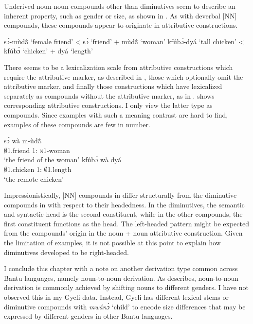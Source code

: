 Underived noun-noun compounds other than diminutives seem to describe an inherent property, such as gender or size, as shown in . As with deverbal [NN] compounds, these compounds appear to originate in attributive constructions.

\ea \label{CompoundNN2}
\ea  sɔ́-mùdã̂ `female friend' < sɔ́ `friend' + mùdã̂ `woman'
\ex kfúbɔ̀-dyá `tall chicken' < kfúbɔ̀ `chicken' + dyá `length'
\z
\z

\noindent There seems to be a lexicalization scale from attributive constructions which require the attributive marker, as described in , those which optionally omit the attributive marker, and finally those constructions which have lexicalized separately as compounds without the attributive marker, as in .  shows corresponding attributive constructions. I only view the latter type as compounds. Since examples with such a meaning contrast are hard to find, examples of these compounds are few in number.

\ea\label {CompoundNN3}
\ea  \gll
sɔ́ wà m-ùdã̂  \\ 
$\emptyset$1.friend 1:{\ATT} \textsc{n}1-woman \\
\trans `the friend of the woman'
\ex
\gll kfúbɔ̀ wà dyá \\
   $\emptyset$1.chicken 1:{\ATT} $\emptyset$1.length \\
\trans `the remote chicken'
\z
\z

Impressionistically, [NN] compounds in  differ structurally from the diminutive compounds in  with respect to their headedness. In the diminutives, the semantic and syntactic head is the second constituent, while in the other compounds, the first constituent functions as the head. The left-headed pattern might be expected from the compounds' origin in the noun + noun attributive construction. Given the limitation of examples, it is not possible at this point to explain how diminutives developed to be right-headed.


I conclude this chapter with a note on another derivation type common across Bantu languages, namely noun-to-noun derivation. As \citet[82]{schadeberg2003} describes, noun-to-noun derivation is commonly achieved by shifting nouns to different genders. I have not  observed this in my Gyeli data. Instead, Gyeli has different lexical stems or diminutive compounds with {\itshape mwánɔ̀} `child' {} to encode size differences that may be expressed by different genders in other Bantu languages.
